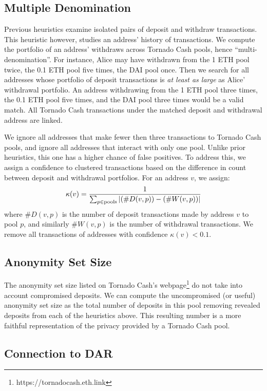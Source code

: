 \documentclass[11pt,a4paper]{article}
\begin{document}
\subsection{Multiple Denomination}

Previous heuristics examine isolated pairs of deposit and withdraw transactions. This heuristic however, studies an address' history of transactions. We compute the portfolio of an address' withdraws across Tornado Cash pools, hence ``multi-denomination''. For instance, Alice may have withdrawn from the 1 ETH pool twice, the 0.1 ETH pool five times, the DAI pool once. Then we search for all addresses whose portfolio of deposit transactions is \textit{at least as large} as Alice' withdrawal portfolio. An address withdrawing from the 1 ETH pool three times, the 0.1 ETH pool five times, and the DAI pool three times would be a valid match. All Tornado Cash transactions under the matched deposit and withdrawal address are linked.

We ignore all addresses that make fewer then three transactions to Tornado Cash pools, and ignore all addresses that interact with only one pool. Unlike prior heuristics, this one has a higher chance of false positives. To address this, we assign a confidence to clustered transactions based on the difference in count between deposit and withdrawal portfolios. For an address $v$, we assign:
\begin{equation*}
  \kappa(v) = \frac{1}{\sum_{p \in \textup{pools}} |(\#D(v,p)) - (\#W(v,p))| }
\end{equation*}
where $\#D(v,p)$ is the number of deposit transactions made by address $v$ to pool $p$, and similarly $\#W(v, p)$ is the number of withdrawal transactions. We remove all transactions of addresses with confidence $\kappa(v) < 0.1$.

\subsection{Anonymity Set Size}

The anonymity set size listed on Tornado Cash's webpage\footnote{https://tornadocash.eth.link} do not take into account compromised deposits. We can compute the uncompromised (or useful) anonymity set size as the total number of deposits in this pool removing revealed deposits from each of the heuristics above. This resulting number is a more faithful representation of the privacy provided by a Tornado Cash pool.

\subsection{Connection to DAR}
\end{document}
